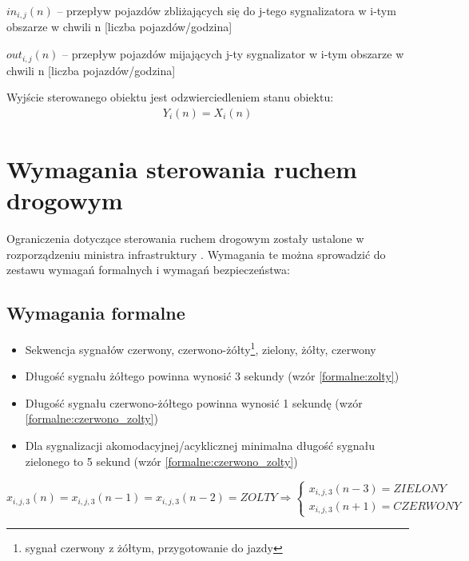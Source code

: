\begin{math} in_{i, j} (n) \end{math} \textrm{ -- przepływ pojazdów zbliżających się do j-tego sygnalizatora w i-tym obszarze w chwili n [liczba pojazdów/godzina]}

\begin{math} out_{i, j} (n) \end{math} \textrm{ -- przepływ pojazdów mijających j-ty sygnalizator w i-tym obszarze w chwili n [liczba pojazdów/godzina]}

\vspace{0.5cm}
Wyjście sterowanego obiektu jest odzwierciedleniem stanu obiektu:
\begin{equation}
	\begin{array}{c}
		Y_i (n) = X_i (n)
	\end{array}
\end{equation}


\section{Wymagania sterowania ruchem drogowym}
\label{sec:model_ograniczenia}
Ograniczenia dotyczące sterowania ruchem drogowym zostały ustalone w rozporządzeniu ministra infrastruktury \cite{rozporzadzenie}. Wymagania te można sprowadzić do zestawu wymagań formalnych i wymagań bezpieczeństwa:
\subsection{Wymagania formalne}
\begin{itemize}
	\item Sekwencja sygnałów czerwony, czerwono-żółty\footnote{sygnał czerwony z żółtym, przygotowanie do jazdy}, zielony, żółty, czerwony
	\item Długość sygnału żółtego powinna wynosić 3 sekundy (wzór \ref{formalne:zolty})
	\item Długość sygnału czerwono-żółtego powinna wynosić 1 sekundę (wzór \ref{formalne:czerwono_zolty})
	\item Dla sygnalizacji akomodacyjnej/acyklicznej minimalna długość sygnału zielonego to 5 sekund (wzór \ref{formalne:czerwono_zolty})
\end{itemize}

\begin{equation}
	\label{formalne:zolty}
	x_{i, j, 3} (n) = x_{i, j, 3} (n-1) = x_{i, j, 3} (n-2) = ZOLTY \Longrightarrow \left\{
	\begin{array}{c}
		x_{i, j, 3} (n-3) = ZIELONY\\
		x_{i, j, 3} (n+1) = CZERWONY
	\end{array}
\end{equation}

